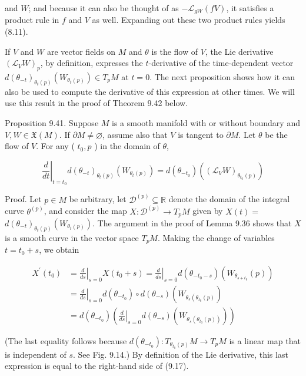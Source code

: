 \documentclass[10pt]{article}
\begin{document}
and $W$; and because it can also be thought of as $-\mathscr{L}_{g W}(f V)$, it satisfies a product rule in $f$ and $V$ as well. Expanding out these two product rules yields (8.11).

If $V$ and $W$ are vector fields on $M$ and $\theta$ is the flow of $V$, the Lie derivative $\left(\mathscr{L}_{V} W\right)_{p}$, by definition, expresses the $t$-derivative of the time-dependent vector $d\left(\theta_{-t}\right)_{\theta_{t}(p)}\left(W_{\theta_{t}(p)}\right) \in T_{p} M$ at $t=0$. The next proposition shows how it can also be used to compute the derivative of this expression at other times. We will use this result in the proof of Theorem 9.42 below.

Proposition 9.41. Suppose $M$ is a smooth manifold with or without boundary and $V, W \in \mathfrak{X}(M)$. If $\partial M \neq \varnothing$, assume also that $V$ is tangent to $\partial M$. Let $\theta$ be the flow of $V$. For any ( $t_{0}, p$ ) in the domain of $\theta$,

$$
\left.\frac{d}{d t}\right|_{t=t_{0}} d\left(\theta_{-t}\right)_{\theta_{t}(p)}\left(W_{\theta_{t}(p)}\right)=d\left(\theta_{-t_{0}}\right)\left(\left(\mathscr{L}_{V} W\right)_{\theta_{t_{0}}(p)}\right)
$$

Proof. Let $p \in M$ be arbitrary, let $\mathscr{D}^{(p)} \subseteq \mathbb{R}$ denote the domain of the integral curve $\theta^{(p)}$, and consider the map $X: \mathscr{D}^{(p)} \rightarrow T_{p} M$ given by $X(t)=$ $d\left(\theta_{-t}\right)_{\theta_{t}(p)}\left(W_{\theta_{t}(p)}\right)$. The argument in the proof of Lemma 9.36 shows that $X$ is a smooth curve in the vector space $T_{p} M$. Making the change of variables $t=t_{0}+s$, we obtain

$$
\begin{aligned}
X^{\prime}\left(t_{0}\right) & =\left.\frac{d}{d s}\right|_{s=0} X\left(t_{0}+s\right)=\left.\frac{d}{d s}\right|_{s=0} d\left(\theta_{-t_{0}-s}\right)\left(W_{\theta_{s+t_{0}}}(p)\right) \\
& =\left.\frac{d}{d s}\right|_{s=0} d\left(\theta_{-t_{0}}\right) \circ d\left(\theta_{-s}\right)\left(W_{\theta_{s}\left(\theta_{t_{0}}(p)\right.}\right) \\
& =d\left(\theta_{-t_{0}}\right)\left(\left.\frac{d}{d s}\right|_{s=0} d\left(\theta_{-s}\right)\left(W_{\theta_{s}\left(\theta_{t_{0}}(p)\right)}\right)\right)
\end{aligned}
$$

(The last equality follows because $d\left(\theta_{-t_{0}}\right): T_{\theta_{t_{0}}(p)} M \rightarrow T_{p} M$ is a linear map that is independent of $s$. See Fig. 9.14.) By definition of the Lie derivative, this last expression is equal to the right-hand side of (9.17).
\end{document}
